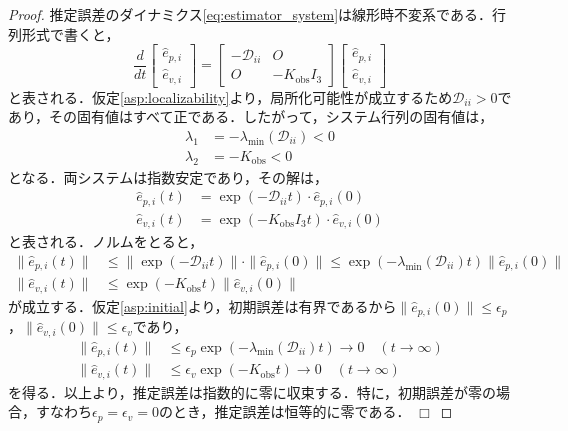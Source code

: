 \documentclass[a4paper]{jarticle}
\def\qed{\hfill $\Box$}
\theoremstyle{definition}
\theoremstyle{remark}
\numberwithin{equation}{section}
\begin{document}
	\begin{proof}
		推定誤差のダイナミクス\eqref{eq:estimator_system}は線形時不変系である．行列形式で書くと，
		\begin{equation}
			\frac{d}{dt} \begin{bmatrix} \hat{e}_{p,i} \\ \hat{e}_{v,i} \end{bmatrix}
			= \begin{bmatrix} -\mathcal{D}_{ii} & O \\ O & -K_{\mathrm{obs}} I_3 \end{bmatrix}
			\begin{bmatrix} \hat{e}_{p,i} \\ \hat{e}_{v,i} \end{bmatrix}
			\label{eq:estimator_matrix}
		\end{equation}
		と表される．仮定\ref{asp:localizability}より，局所化可能性が成立するため$\mathcal{D}_{ii} > 0$であり，その固有値はすべて正である．したがって，システム行列の固有値は，
		\begin{align}
			\lambda_1 &= -\lambda_{\min}(\mathcal{D}_{ii}) < 0\\
			\lambda_2 &= -K_{\mathrm{obs}} < 0
		\end{align}
		となる．両システムは指数安定であり，その解は，
		\begin{align}
			\hat{e}_{p,i}(t) &= \exp(-\mathcal{D}_{ii} t) \cdot \hat{e}_{p,i}(0)\\
			\hat{e}_{v,i}(t) &= \exp(-K_{\mathrm{obs}} I_3 t) \cdot \hat{e}_{v,i}(0)
		\end{align}
		と表される．ノルムをとると，
		\begin{align}
			\|\hat{e}_{p,i}(t)\| &\le \|\exp(-\mathcal{D}_{ii} t)\| \cdot \|\hat{e}_{p,i}(0)\| \le \exp(-\lambda_{\min}(\mathcal{D}_{ii}) t) \|\hat{e}_{p,i}(0)\|\\
			\|\hat{e}_{v,i}(t)\| &\le \exp(-K_{\mathrm{obs}} t) \|\hat{e}_{v,i}(0)\|
		\end{align}
		が成立する．仮定\ref{asp:initial}より，初期誤差は有界であるから$\|\hat{e}_{p,i}(0)\| \le \epsilon_p$，$\|\hat{e}_{v,i}(0)\| \le \epsilon_v$であり，
		\begin{align}
			\|\hat{e}_{p,i}(t)\| &\le \epsilon_p \exp(-\lambda_{\min}(\mathcal{D}_{ii}) t) \to 0 \quad (t \to \infty)\\
			\|\hat{e}_{v,i}(t)\| &\le \epsilon_v \exp(-K_{\mathrm{obs}} t) \to 0 \quad (t \to \infty)
		\end{align}
		を得る．以上より，推定誤差は指数的に零に収束する．特に，初期誤差が零の場合，すなわち$\epsilon_p = \epsilon_v = 0$のとき，推定誤差は恒等的に零である． \qed
	\end{proof}
	
\end{document}
